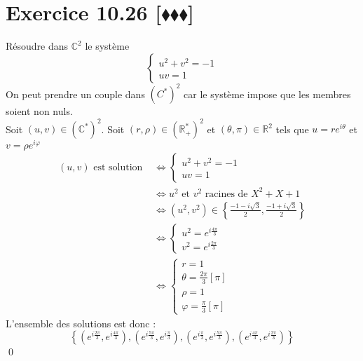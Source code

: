 \documentclass[10pt]{article}
\begin{document}
\section*{Exercice 10.26 [$\blacklozenge\blacklozenge\blacklozenge$]}
\begin{tcolorbox}[enhanced, width=7in, center, size=fbox, fontupper=\large, drop shadow southwest]
    Résoudre dans $\mathbb{C}^2$ le système
    \begin{equation*}
        \begin{cases}
            u^2 + v^2 = -1\\
            uv = 1
        \end{cases}
    \end{equation*}
    On peut prendre un couple dans $(C^*)^2$ car le système impose que les membres soient non nuls.\\
    Soit $(u,v)\in(\mathbb{C}^*)^2$. Soit $(r,\rho)\in(\mathbb{R}_+^*)^2$ et $(\theta, \pi)\in\mathbb{R}^2$ tels que $u=re^{i\theta}$ et $v=\rho e^{i\varphi}$
    \begin{align*}
        (u,v) \text{ est solution } &\iff \begin{cases}
            u^2 + v^2 = -1\\
            uv = 1
        \end{cases}\\
        &\iff u^2 \text{ et } v^2 \text{ racines de } X^2 + X + 1\\
        &\iff(u^2, v^2)\in\left\{\frac{-1-i\sqrt{3}}{2}, \frac{-1+i\sqrt{3}}{2}\right\}\\
        &\iff\begin{cases}
            u^2 = e^{i\frac{4\pi}{3}}\\
            v^2 = e^{i\frac{2\pi}{3}}
        \end{cases}\\
        &\iff\begin{cases}
            r = 1\\
            \theta = \frac{2\pi}{3}[\pi]\\
            \rho = 1\\
            \varphi = \frac{\pi}{3}[\pi]
        \end{cases}
    \end{align*}
    L'ensemble des solutions est donc :
    \begin{equation*}
        \left\{(e^{i\frac{2\pi}{3}}, e^{i\frac{4\pi}{3}}), (e^{i\frac{5\pi}{3}}, e^{i\frac{\pi}{3}}), (e^{i\frac{\pi}{3}}, e^{i\frac{5\pi}{3}}), (e^{i\frac{4\pi}{3}}, e^{i\frac{2\pi}{3}})\right\}
    \end{equation*}
    \qed
\end{tcolorbox}
\end{document}
